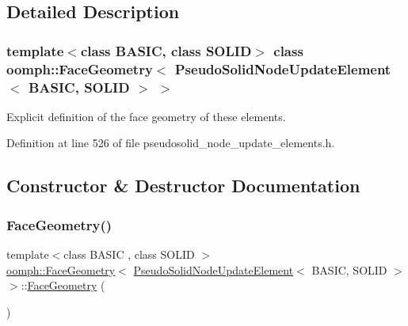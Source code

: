 \subsection{Detailed Description}
\subsubsection*{template$<$class B\+A\+S\+IC, class S\+O\+L\+ID$>$\newline
class oomph\+::\+Face\+Geometry$<$ Pseudo\+Solid\+Node\+Update\+Element$<$ B\+A\+S\+I\+C, S\+O\+L\+I\+D $>$ $>$}

Explicit definition of the face geometry of these elements. 

Definition at line 526 of file pseudosolid\+\_\+node\+\_\+update\+\_\+elements.\+h.



\subsection{Constructor \& Destructor Documentation}
\mbox{\label{classoomph_1_1FaceGeometry_3_01PseudoSolidNodeUpdateElement_3_01BASIC_00_01SOLID_01_4_01_4_aca4982e3df0a3293daf1192aa380f5a3}} 
\subsubsection{\texorpdfstring{Face\+Geometry()}{FaceGeometry()}}
{\footnotesize\ttfamily template$<$class B\+A\+S\+IC , class S\+O\+L\+ID $>$ \\
\hyperlink{classoomph_1_1FaceGeometry}{oomph\+::\+Face\+Geometry}$<$ \hyperlink{classoomph_1_1PseudoSolidNodeUpdateElement}{Pseudo\+Solid\+Node\+Update\+Element}$<$ B\+A\+S\+IC, S\+O\+L\+ID $>$ $>$\+::\hyperlink{classoomph_1_1FaceGeometry}{Face\+Geometry} (\begin{DoxyParamCaption}{ }\end{DoxyParamCaption})\hspace{0.3cm}{\ttfamily [inline]}}



